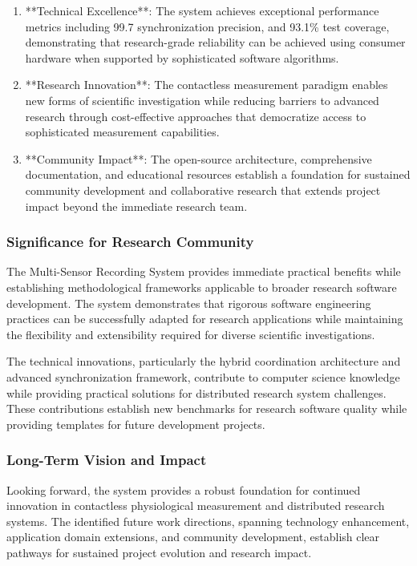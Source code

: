 \documentclass[12pt,a4paper]{article}
\begin{document}
\begin{enumerate}
\item **Technical Excellence**: The system achieves exceptional performance metrics including 99.7%
   synchronization precision, and 93.1\% test coverage, demonstrating that research-grade reliability can be achieved
   using consumer hardware when supported by sophisticated software algorithms.

\item **Research Innovation**: The contactless measurement paradigm enables new forms of scientific investigation while
   reducing barriers to advanced research through cost-effective approaches that democratize access to sophisticated
   measurement capabilities.

\item **Community Impact**: The open-source architecture, comprehensive documentation, and educational resources establish
   a foundation for sustained community development and collaborative research that extends project impact beyond the
   immediate research team.

\end{enumerate}
\subsubsection{Significance for Research Community}

The Multi-Sensor Recording System provides immediate practical benefits while establishing methodological frameworks
applicable to broader research software development. The system demonstrates that rigorous software engineering
practices can be successfully adapted for research applications while maintaining the flexibility and extensibility
required for diverse scientific investigations.

The technical innovations, particularly the hybrid coordination architecture and advanced synchronization framework,
contribute to computer science knowledge while providing practical solutions for distributed research system challenges.
These contributions establish new benchmarks for research software quality while providing templates for future
development projects.

\subsubsection{Long-Term Vision and Impact}

Looking forward, the system provides a robust foundation for continued innovation in contactless physiological
measurement and distributed research systems. The identified future work directions, spanning technology enhancement,
application domain extensions, and community development, establish clear pathways for sustained project evolution and
research impact.
\end{document}
